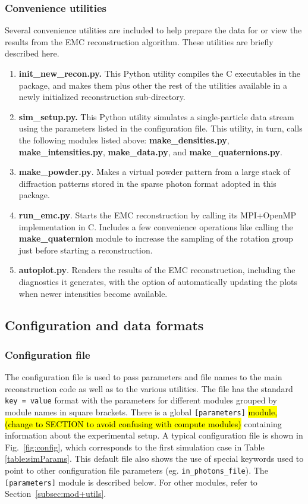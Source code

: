 \documentclass[]{iucr}              %
\begin{document}
\subsubsection{Convenience utilities}\label{subsubsec:utils}
Several convenience utilities are included to help prepare the data for or view the results from the EMC reconstruction algorithm. These utilities are briefly described here. 
\begin{enumerate}
\item{\bf init\_new\_recon.py.} This Python utility compiles the C executables in the package, and makes them plus other the rest of the utilities available in a newly initialized reconstruction sub-directory.
\item{\bf sim\_setup.py.} This Python utility simulates a single-particle data stream using the parameters listed in the configuration file. This utility, in turn, calls the following modules listed above: {\bf make\_densities.py}, {\bf make\_intensities.py}, {\bf make\_data.py}, and {\bf make\_quaternions.py}.
\item{\bf make\_powder.py}. Makes a virtual powder pattern from a large stack of diffraction patterns stored in the sparse photon format adopted in this package.
\item{\bf run\_emc.py}. Starts the EMC reconstruction by calling its MPI+OpenMP implementation in C. Includes a few convenience operations like calling the {\bf make\_quaternion} module to increase the sampling of the rotation group just before starting a reconstruction.
\item{\bf autoplot.py}. Renders the results of the EMC reconstruction, including the diagnostics it generates, with the option of automatically updating the plots when newer intensities become available.
\end{enumerate}


\subsection{Configuration and data formats}\label{subsec:formats}
\subsubsection{Configuration file}\label{subsubsec:config}
The configuration file is used to pass parameters and file names to the main reconstruction code as well as to the various utilities. The file has the standard \texttt{key = value} format with the parameters for different modules grouped by module names in square brackets. There is a global \texttt{[parameters]} \hl{module, (change to SECTION to avoid confusing with compute modules) } containing information about the experimental setup. A typical configuration file is shown in Fig.~\ref{fig:config}, which corresponds to the first simulation case in Table \ref{table:simParams}. This default file also shows the use of special keywords used to point to other configuration file parameters (eg. \texttt{in\_photons\_file}). The \texttt{[parameters]} module is described below. For other modules, refer to Section~\ref{subsec:mod+utils}.
\end{document}
